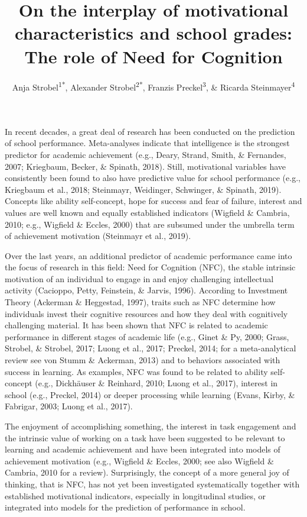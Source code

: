 \documentclass[
  man]{apa6}
\title{On the interplay of motivational characteristics and school grades: The role of Need for Cognition}
\author{Anja Strobel\textsuperscript{1*}, Alexander Strobel\textsuperscript{2*}, Franzis Preckel\textsuperscript{3}, \& Ricarda Steinmayer\textsuperscript{4}}
\date{}
\affiliation{\vspace{0.5cm}\textsuperscript{1} Department of Psychology, Chemnitz University of Technology, Chemnitz, Germany\\\textsuperscript{2} Faculty of Psychology, Technische Universität Dresden, Dresden, Germany\\\textsuperscript{3} Department of Psychology, University of Trier, Trier, Germany\\\textsuperscript{4} Department of Psychology, TU Dortmund University, Dortmund, Germany}
\begin{document}
\maketitle

In recent decades, a great deal of research has been conducted on the prediction of school performance. Meta-analyses indicate that intelligence is the strongest predictor for academic achievement (e.g., Deary, Strand, Smith, \& Fernandes, 2007; Kriegbaum, Becker, \& Spinath, 2018). Still, motivational variables have consistently been found to also have predictive value for school performance (e.g., Kriegbaum et al., 2018; Steinmayr, Weidinger, Schwinger, \& Spinath, 2019). Concepts like ability self-concept, hope for success and fear of failure, interest and values are well known and equally established indicators (Wigfield \& Cambria, 2010; e.g., Wigfield \& Eccles, 2000) that are subsumed under the umbrella term of achievement motivation (Steinmayr et al., 2019).

Over the last years, an additional predictor of academic performance came into the focus of research in this field: Need for Cognition (NFC), the stable intrinsic motivation of an individual to engage in and enjoy challenging intellectual activity (Cacioppo, Petty, Feinstein, \& Jarvis, 1996). According to Investment Theory (Ackerman \& Heggestad, 1997), traits such as NFC determine how individuals invest their cognitive resources and how they deal with cognitively challenging material. It has been shown that NFC is related to academic performance in different stages of academic life (e.g., Ginet \& Py, 2000; Grass, Strobel, \& Strobel, 2017; Luong et al., 2017; Preckel, 2014; for a meta-analytical review see von Stumm \& Ackerman, 2013) and to behaviors associated with success in learning. As examples, NFC was found to be related to ability self-concept (e.g., Dickhäuser \& Reinhard, 2010; Luong et al., 2017), interest in school (e.g., Preckel, 2014) or deeper processing while learning (Evans, Kirby, \& Fabrigar, 2003; Luong et al., 2017).

The enjoyment of accomplishing something, the interest in task engagement and the intrinsic value of working on a task have been suggested to be relevant to learning and academic achievement and have been integrated into models of achievement motivation (e.g., Wigfield \& Eccles, 2000; see also Wigfield \& Cambria, 2010 for a review). Surprisingly, the concept of a more general joy of thinking, that is NFC, has not yet been investigated systematically together with established motivational indicators, especially in longitudinal studies, or integrated into models for the prediction of performance in school.
\end{document}
